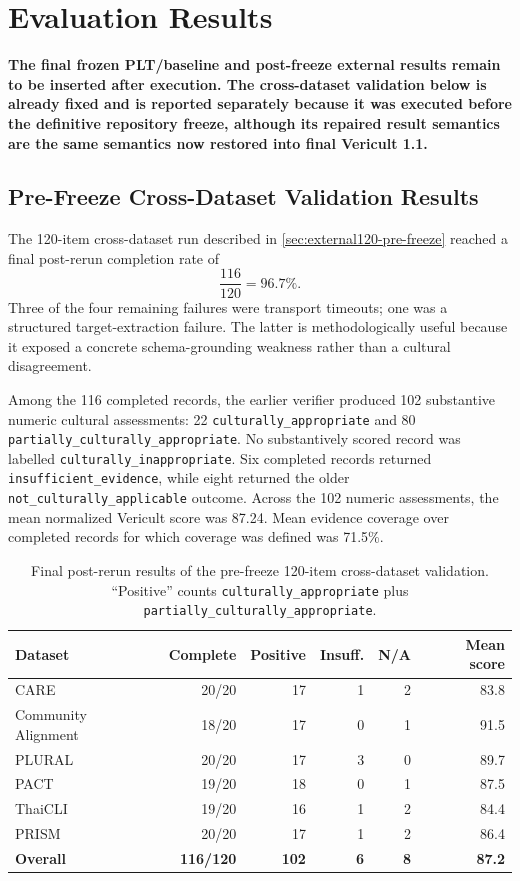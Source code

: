 \chapter{Evaluation Results}
\label{ch:results}

\textbf{The final frozen PLT/baseline and post-freeze external results remain to be inserted after execution. The cross-dataset validation below is already fixed and is reported separately because it was executed before the definitive repository freeze, although its repaired result semantics are the same semantics now restored into final Vericult 1.1.}

\section{Pre-Freeze Cross-Dataset Validation Results}
\label{sec:external120-results}

The 120-item cross-dataset run described in \cref{sec:external120-pre-freeze} reached a final post-rerun completion rate of
\[
\frac{116}{120}=96.7\%.
\]
Three of the four remaining failures were transport timeouts; one was a structured target-extraction failure. The latter is methodologically useful because it exposed a concrete schema-grounding weakness rather than a cultural disagreement.

Among the 116 completed records, the earlier verifier produced 102 substantive numeric cultural assessments: 22 \texttt{culturally\_appropriate} and 80 \texttt{partially\_culturally\_appropriate}. No substantively scored record was labelled \texttt{culturally\_inappropriate}. Six completed records returned \texttt{insufficient\_evidence}, while eight returned the older \texttt{not\_culturally\_applicable} outcome. Across the 102 numeric assessments, the mean normalized Vericult score was 87.24. Mean evidence coverage over completed records for which coverage was defined was 71.5\%.

\begin{table}[htbp]
\centering
\footnotesize
\caption{Final post-rerun results of the pre-freeze 120-item cross-dataset validation. ``Positive'' counts \texttt{culturally\_appropriate} plus \texttt{partially\_culturally\_appropriate}.}
\label{tab:external120-results}
\begin{tabularx}{\textwidth}{lrrrrr}
\toprule
\textbf{Dataset} & \textbf{Complete} & \textbf{Positive} & \textbf{Insuff.} & \textbf{N/A} & \textbf{Mean score} \\
\midrule
CARE & 20/20 & 17 & 1 & 2 & 83.8 \\
Community Alignment & 18/20 & 17 & 0 & 1 & 91.5 \\
PLURAL & 20/20 & 17 & 3 & 0 & 89.7 \\
PACT & 19/20 & 18 & 0 & 1 & 87.5 \\
ThaiCLI & 19/20 & 16 & 1 & 2 & 84.4 \\
PRISM & 20/20 & 17 & 1 & 2 & 86.4 \\
\midrule
\textbf{Overall} & \textbf{116/120} & \textbf{102} & \textbf{6} & \textbf{8} & \textbf{87.2} \\
\bottomrule
\end{tabularx}
\end{table}

